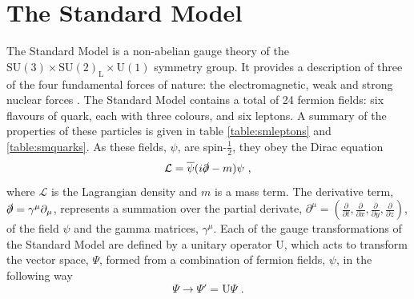 \section{The Standard Model}
The Standard Model is a non-abelian gauge theory of the $\text{SU}(3) \times \text{SU}(2)_{\text{L}} \times \text{U}(1)$ symmetry group.  It provides a description of three of the four fundamental forces of nature: the electromagnetic, weak and strong nuclear forces \cite{Griffiths:1987tj,Peskin:1995ev}.  The Standard Model contains a total of 24 fermion fields: six flavours of quark, each with three colours, and six leptons.  A summary of the properties of these particles is given in table \ref{table:smleptons} and \ref{table:smquarks}.  As these fields, $\psi$, are spin-$\frac{1}{2}$, they obey the Dirac equation
%
\begin{equation}
\mathcal{L} = \overline{\psi}(i \slashed{\partial} - m)\psi \text{ ,}
\end{equation}
%
\noindent where $\mathcal{L}$ is the Lagrangian density and $m$ is a mass term.  The derivative term, $\slashed{\partial} = \gamma^{\mu}\partial_{\mu}$, represents a summation over the partial derivate, $\partial^{\mu} = (\frac{\partial}{\partial{t}},\frac{\partial}{\partial{x}},\frac{\partial}{\partial{y}},\frac{\partial}{\partial{z}})$, of the field $\psi$ and the gamma matrices, $\gamma^{\mu}$.  Each of the gauge transformations of the Standard Model are defined by a unitary operator \textrm{U}, which acts to transform the vector space, $\Psi$, formed from a combination of fermion fields, $\psi$, in the following way
%
\begin{equation}
\Psi \rightarrow \Psi' = \textrm{U}\Psi \text{ .}
\end{equation}
%
